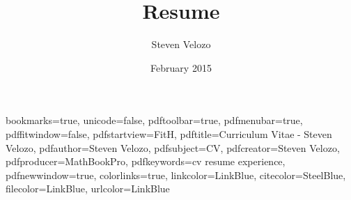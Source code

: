 
\usepackage{amsmath}

\usepackage{graphicx}
\graphicspath{{graphics/}}

\title{Resume}
\author[Steven Velozo]{Steven Velozo}
\date{February 2015}
\newcommand{\displayaddress}{\marginnote[0.9cm]{\raggedleft{\href{mailto:steven@velozo.com}{steven@velozo.com}\\(206) 604-4981 }}}
\usepackage[english]{babel}
\usepackage{booktabs}
\usepackage{units}
\usepackage{fancyvrb}

\usepackage{multicol}

\usepackage{rotating}
\usepackage{tikz}
\usetikzlibrary{arrows,backgrounds,snakes}


\newcommand{\mhstandout}[1]{\textbf{\textcolor{DarkGray}{#1}}}
\newcommand{\shstandout}[1]{\textbf{\textcolor{BurntOrange}{#1}}}
\newcommand{\shyears}[1]{\small{\texttt{\textcolor{LightGray}{#1}}}}
\newcommand{\pstandout}[1]{\textcolor{BrightRed}{#1}}
\newcommand{\competency}[1]{\textcolor{BrightRed}{#1}}

\hypersetup
{
    bookmarks=true,         %
    unicode=false,          %
    pdftoolbar=true,        %
    pdfmenubar=true,        %
    pdffitwindow=false,     %
    pdfstartview={FitH},    %
    pdftitle={Curriculum Vitae - Steven Velozo},    %
    pdfauthor={Steven Velozo},     %
    pdfsubject={CV},   %
    pdfcreator={Steven Velozo},   %
    pdfproducer={MathBookPro}, %
    pdfkeywords={cv} {resume} {experience}, %
    pdfnewwindow=true,      %
    colorlinks=true,       %
    linkcolor=LinkBlue,          %
    citecolor=SteelBlue,        %
    filecolor=LinkBlue,      %
    urlcolor=LinkBlue           %
}

\makeatletter
\newlength{\fullpagewidth}
\AtBeginDocument{\setlength{\fullpagewidth}{\@tufte@fullwidth}}
\makeatother

\newcommand{\fullwidthmode}[1]{\noindent\begin{minipage}{\fullpagewidth}#1\end{minipage}}
